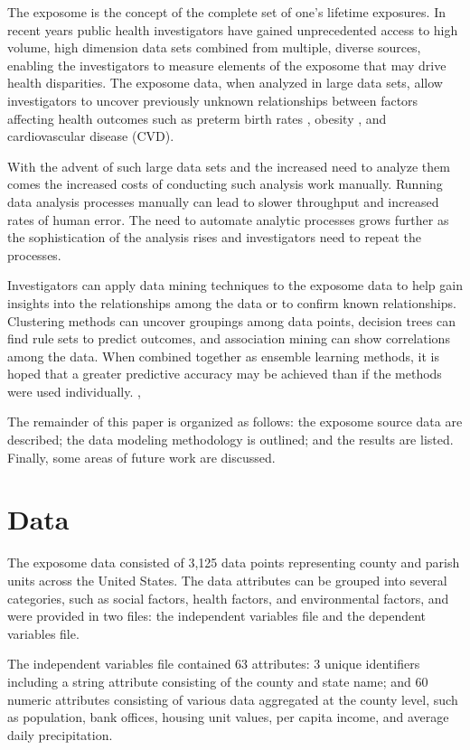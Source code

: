 \documentclass[conference,compsoc]{IEEEtran}
\begin{document}
The exposome is the concept of the complete set of one's lifetime exposures. \cite{juarez} In recent years public health investigators have gained 
unprecedented access to high volume, high dimension data sets combined from multiple, diverse sources,
enabling the investigators to measure elements of the exposome that may drive health disparities. The exposome data,
when analyzed in large data sets, allow investigators to uncover previously unknown relationships between factors affecting 
health outcomes such as preterm birth rates \cite{kershenbaum},
obesity \cite{raman}, and cardiovascular disease (CVD).

With the advent of such large data sets and the increased need to analyze them comes the increased costs of conducting such analysis work manually.
Running data analysis processes manually can lead to slower throughput and increased rates of human error. The need to automate analytic processes grows further
as the sophistication of the analysis rises and investigators need to repeat the processes.

Investigators can apply data mining techniques to the exposome data to help gain insights into the relationships among the data or to confirm known
relationships. Clustering methods can uncover groupings among data points, decision trees can find rule sets to predict outcomes, and association mining can
show correlations among the data. When combined together as ensemble learning methods, it is hoped that a greater predictive accuracy may be achieved than
if the methods were used individually. \cite{bramer}, \cite{aggarwal}

The remainder of this paper is organized as follows: the exposome source data are described; the data modeling methodology is outlined;
and the results are listed. Finally, some areas of future work are discussed.

\section{Data}

The exposome data consisted of 3,125 data points representing county and parish units across the United States. 
The data attributes can be grouped into several categories, such as social factors, health factors, and environmental factors,
and were provided in two files: the independent variables file and the dependent variables file.

The independent variables file contained 63 attributes: 3 unique identifiers including a string attribute consisting of the county and state name;
and 60 numeric attributes consisting of various data aggregated at the county level, such as population, bank offices, housing unit values, per capita income,
and average daily precipitation.
\end{document}
